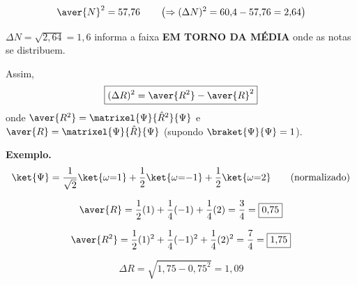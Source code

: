 \begin{equation}
    \aver{N}^2 = 57{,}76 \qquad \left(\Rightarrow (\Delta N)^2 = 60{,}4 - 57{,}76 = 2{,}64\right)
\label{eq:aula12_N_medio_quadrado}
\end{equation}

$\Delta N = \sqrt{2{,}64} = 1{,}6$ informa a faixa \textbf{EM TORNO DA MÉDIA} onde as notas se distribuem.

\begin{center}
\end{center}

Assim,
\begin{equation}
    \boxed{(\Delta R)^2 = \aver{R^2} - \aver{R}^2}
\label{eq:aula12_formula_geral_variancia}
\end{equation}
onde $\aver{R^2} = \matrixel{\Psi}{\hat{R}^2}{\Psi}$ e $\aver{R} = \matrixel{\Psi}{\hat{R}}{\Psi}$ (supondo $\braket{\Psi}{\Psi}=1$).

\textbf{Exemplo.}
\begin{equation}
    \ket{\Psi} = \frac{1}{\sqrt{2}}\ket{\omega{=}1} + \frac{1}{2}\ket{\omega{=}{-}1} + \frac{1}{2}\ket{\omega{=}2} \qquad \text{(normalizado)}
\label{eq:aula12_exemplo_variancia_estado}
\end{equation}

\begin{equation}
    \aver{R} = \frac{1}{2}(1) + \frac{1}{4}(-1) + \frac{1}{4}(2) = \frac{3}{4} = \boxed{0{,}75}
\label{eq:aula12_exemplo_R_medio}
\end{equation}

\begin{equation}
    \aver{R^2} = \frac{1}{2}(1)^2 + \frac{1}{4}(-1)^2 + \frac{1}{4}(2)^2 = \frac{7}{4} = \boxed{1{,}75}
\label{eq:aula12_exemplo_R2_medio}
\end{equation}

\begin{equation}
    \Delta R = \sqrt{1{,}75 - 0{,}75^2} = \boxed{1{,}09}
\label{eq:aula12_exemplo_deltaR}
\end{equation}

